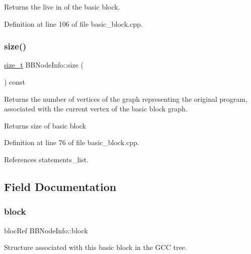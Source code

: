 Returns the live in of the basic block. 



Definition at line 106 of file basic\+\_\+block.\+cpp.

\mbox{\label{structBBNodeInfo_a49f0b957871c3d7660d048e0bb63e171}} 
\subsubsection{\texorpdfstring{size()}{size()}}
{\footnotesize\ttfamily \hyperlink{tutorial__fpt__2017_2intro_2sixth_2test_8c_a7c94ea6f8948649f8d181ae55911eeaf}{size\+\_\+t} B\+B\+Node\+Info\+::size (\begin{DoxyParamCaption}{ }\end{DoxyParamCaption}) const}



Returns the number of vertices of the graph representing the original program, associated with the current vertex of the basic block graph. 

\begin{DoxyReturn}{Returns}
size of basic block 
\end{DoxyReturn}


Definition at line 76 of file basic\+\_\+block.\+cpp.



References statements\+\_\+list.



\subsection{Field Documentation}
\mbox{\label{structBBNodeInfo_a1e0c9fddf2bc58caafddaecb7163c8b5}} 
\subsubsection{\texorpdfstring{block}{block}}
{\footnotesize\ttfamily bloc\+Ref B\+B\+Node\+Info\+::block}



Structure associated with this basic block in the G\+CC tree. 



